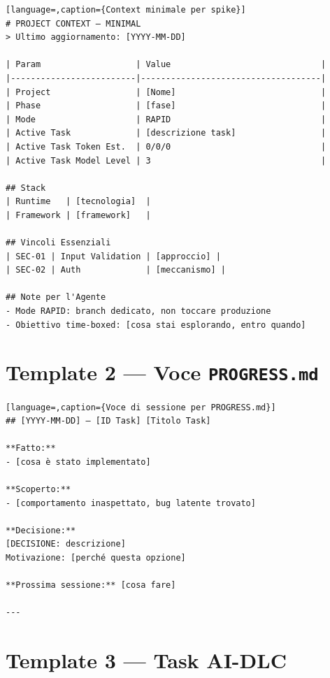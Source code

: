 \begin{lstlisting}[language=,caption={Context minimale per spike}]
# PROJECT CONTEXT — MINIMAL
> Ultimo aggiornamento: [YYYY-MM-DD]

| Param                   | Value                              |
|-------------------------|------------------------------------|
| Project                 | [Nome]                             |
| Phase                   | [fase]                             |
| Mode                    | RAPID                              |
| Active Task             | [descrizione task]                 |
| Active Task Token Est.  | 0/0/0                              |
| Active Task Model Level | 3                                  |

## Stack
| Runtime   | [tecnologia]  |
| Framework | [framework]   |

## Vincoli Essenziali
| SEC-01 | Input Validation | [approccio] |
| SEC-02 | Auth             | [meccanismo] |

## Note per l'Agente
- Mode RAPID: branch dedicato, non toccare produzione
- Obiettivo time-boxed: [cosa stai esplorando, entro quando]
\end{lstlisting}

\section*{Template 2 --- Voce \texttt{PROGRESS.md}}

\begin{lstlisting}[language=,caption={Voce di sessione per PROGRESS.md}]
## [YYYY-MM-DD] — [ID Task] [Titolo Task]

**Fatto:**
- [cosa è stato implementato]

**Scoperto:**
- [comportamento inaspettato, bug latente trovato]

**Decisione:**
[DECISIONE: descrizione]
Motivazione: [perché questa opzione]

**Prossima sessione:** [cosa fare]

---
\end{lstlisting}

\section*{Template 3 --- Task AI-DLC}


